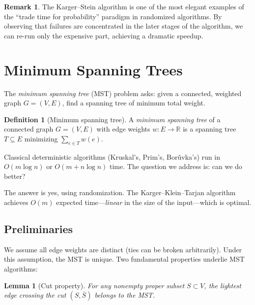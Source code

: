 \documentclass[twoside,12pt]{book}
\theoremstyle{plain}
\newtheorem{lemma}[theorem]{Lemma}
\theoremstyle{definition}
\newtheorem{definition}[theorem]{Definition}
\newtheorem{remark}[theorem]{Remark}
\theoremstyle{remark}
\begin{document}
\begin{remark}
The Karger--Stein algorithm is one of the most elegant examples of the ``trade time for probability'' paradigm in randomized algorithms. By observing that failures are concentrated in the later stages of the algorithm, we can re-run only the expensive part, achieving a dramatic speedup.
\end{remark}



\section{Minimum Spanning Trees}
\label{sec:mst}

The \emph{minimum spanning tree} (MST) problem asks: given a connected, weighted graph $G = (V, E)$, find a spanning tree of minimum total weight.

\begin{definition}[Minimum spanning tree]
A \emph{minimum spanning tree} of a connected graph $G = (V, E)$ with edge weights $w: E \to \mathbb{R}$ is a spanning tree $T \subseteq E$ minimizing $\sum_{e \in T} w(e)$.
\end{definition}

Classical deterministic algorithms (Kruskal's, Prim's, Bor\v{u}vka's) run in $O(m \log n)$ or $O(m + n \log n)$ time. The question we address is: can we do better?

The answer is yes, using randomization. The Karger--Klein--Tarjan algorithm achieves $O(m)$ expected time---\emph{linear} in the size of the input---which is optimal.

\subsection{Preliminaries}

We assume all edge weights are distinct (ties can be broken arbitrarily). Under this assumption, the MST is unique. Two fundamental properties underlie MST algorithms:

\begin{lemma}[Cut property]
For any nonempty proper subset $S \subset V$, the lightest edge crossing the cut $(S, \bar{S})$ belongs to the MST.
\end{lemma}
\end{document}

